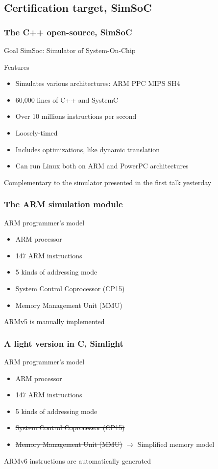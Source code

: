 \documentclass{beamer} %
\begin{document}
\subsection{Certification target, SimSoC}

\begin{frame}
\frametitle{The C++ open-source, SimSoC}
\begin{block}{Goal}
SimSoc: Simulator of System-On-Chip
\end{block}
\begin{block}{Features}
\begin{itemize}
\item Simulates various architectures: ARM PPC MIPS SH4
\item 60,000 lines of C++ and SystemC
\item Over 10 millions instructions per second
\item Loosely-timed
\item Includes optimizations, like dynamic translation
\item Can run Linux both on ARM and PowerPC architectures
\end{itemize}
\end{block}
\bigskip
Complementary to the simulator presented in the first talk yesterday
\end{frame}

\begin{frame}
\frametitle{The ARM simulation module}

\begin{block}{ARM programmer's model}
\begin{itemize}
\item ARM processor
\item 147 ARM instructions
\item 5 kinds of addressing mode
\item System Control Coprocessor (CP15)
\item Memory Management Unit (MMU)
\end{itemize}
\end{block}
\bigskip
ARMv5 is manually implemented
\end{frame}

\begin{frame}
\frametitle{A light version in C, Simlight}
\begin{block}{ARM programmer's model}
\begin{itemize}
\item ARM processor
\item 147 ARM instructions
\item 5 kinds of addressing mode
\item \sout{System Control Coprocessor (CP15)}
\item \sout{Memory Management Unit (MMU)} $\rightarrow$ Simplified memory model 
\end{itemize}
\end{block}
\bigskip
ARMv6 instructions are automatically generated
\end{frame}
\end{document}
